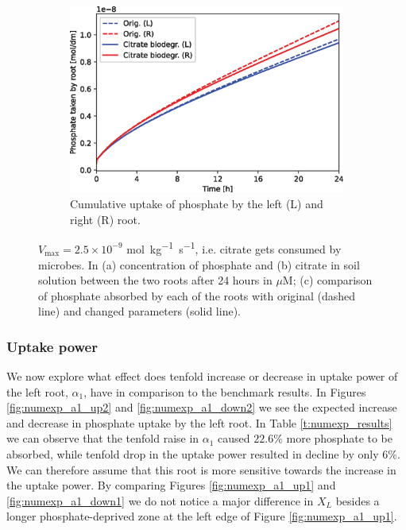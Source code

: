 \documentclass[11pt]{article}
\numberwithin{equation}{section}
\begin{document}
\begin{figure}[!htb]
\begin{subfigure}[t]{0.37\textwidth}
    \includegraphics[width=\textwidth]{Figures/citratevmaxnonzero.eps}
    \caption{Cumulative uptake of phosphate by the left (L) and right (R) root.}
    \label{fig:numexp_vmax2}
\end{subfigure}
\caption{$V_{\max} = 2.5 \times 10^{-9}$ \si{mol.kg^{-1}.s^{-1}}, i.e. citrate gets consumed by microbes. In (a) concentration of phosphate and (b) citrate in soil solution between the two roots after 24 hours in $\mu$M; (c) comparison of phosphate absorbed by each of the roots with original (dashed line) and changed parameters (solid line).}
\end{figure}

\subsubsection{Uptake power}
\label{sec:numexp_a1}
We now explore what effect does tenfold increase or decrease in uptake power of the left root, $\alpha_1$, have in comparison to the benchmark results. In Figures \ref{fig:numexp_a1_up2} and \ref{fig:numexp_a1_down2} we see the expected increase and decrease in phosphate uptake by the left root. In Table \ref{t:numexp_results} we can observe that the tenfold raise in $\alpha_1$ caused $22.6 \%$ more phosphate to be absorbed, while tenfold drop in the uptake power resulted in decline by only $6 \%$. We can therefore assume that this root is more sensitive towards the increase in the uptake power. By comparing Figures \ref{fig:numexp_a1_up1} and \ref{fig:numexp_a1_down1} we do not notice a major difference in $X_L$ besides a longer phosphate-deprived zone at the left edge of Figure \ref{fig:numexp_a1_up1}.
\end{document}
